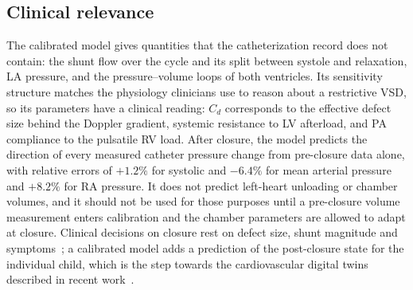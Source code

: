 \documentclass{article}
\begin{document}
\subsection{Clinical relevance}
The calibrated model gives quantities that the catheterization record does not contain: the shunt flow over the cycle and its split between systole and relaxation, LA pressure, and the pressure--volume loops of both ventricles. Its sensitivity structure matches the physiology clinicians use to reason about a restrictive VSD, so its parameters have a clinical reading: $C_d$ corresponds to the effective defect size behind the Doppler gradient, systemic resistance to LV afterload, and PA compliance to the pulsatile RV load. After closure, the model predicts the direction of every measured catheter pressure change from pre-closure data alone, with relative errors of $+1.2\%$ for systolic and $-6.4\%$ for mean arterial pressure and $+8.2\%$ for RA pressure. It does not predict left-heart unloading or chamber volumes, and it should not be used for those purposes until a pre-closure volume measurement enters calibration and the chamber parameters are allowed to adapt at closure. Clinical decisions on closure rest on defect size, shunt magnitude and symptoms~\cite{Rao2024}; a calibrated model adds a prediction of the post-closure state for the individual child, which is the step towards the cardiovascular digital twins described in recent work~\cite{Niederer2021,Katsoulakis2024}.
\end{document}

